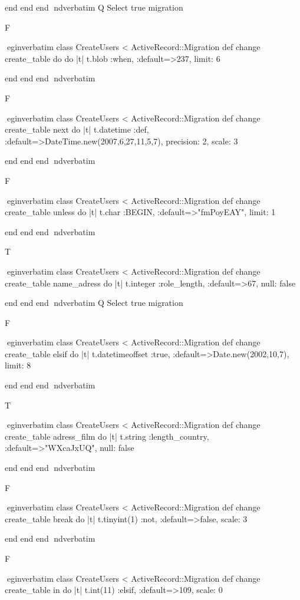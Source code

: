    end 
  end 
end
nd{verbatim}
Q
 Select true migration

F

egin{verbatim}
 class CreateUsers < ActiveRecord::Migration 
  def change 
    create_table do do |t| 
      t.blob :when, :default=>237, limit: 6
    
    end 
  end 
end
nd{verbatim}

F

egin{verbatim}
 class CreateUsers < ActiveRecord::Migration 
  def change 
    create_table next do |t| 
      t.datetime :def, :default=>DateTime.new(2007,6,27,11,5,7), precision: 2, scale: 3
    
    end 
  end 
end
nd{verbatim}

F

egin{verbatim}
 class CreateUsers < ActiveRecord::Migration 
  def change 
    create_table unless do |t| 
      t.char :BEGIN, :default=>"fmPoyEAY", limit: 1
    
    end 
  end 
end
nd{verbatim}

T

egin{verbatim}
 class CreateUsers < ActiveRecord::Migration 
  def change 
    create_table name_adress do |t| 
      t.integer :role_length, :default=>67, null: false
    
    end 
  end 
end
nd{verbatim}
Q
 Select true migration

F

egin{verbatim}
 class CreateUsers < ActiveRecord::Migration 
  def change 
    create_table elsif do |t| 
      t.datetimeoffset :true, :default=>Date.new(2002,10,7), limit: 8
    
    end 
  end 
end
nd{verbatim}

T

egin{verbatim}
 class CreateUsers < ActiveRecord::Migration 
  def change 
    create_table adress_film do |t| 
      t.string :length_country, :default=>"WXcaJxUQ", null: false
    
    end 
  end 
end
nd{verbatim}

F

egin{verbatim}
 class CreateUsers < ActiveRecord::Migration 
  def change 
    create_table break do |t| 
      t.tinyint(1) :not, :default=>false, scale: 3
    
    end 
  end 
end
nd{verbatim}

F

egin{verbatim}
 class CreateUsers < ActiveRecord::Migration 
  def change 
    create_table in do |t| 
      t.int(11) :elsif, :default=>109, scale: 0
    
